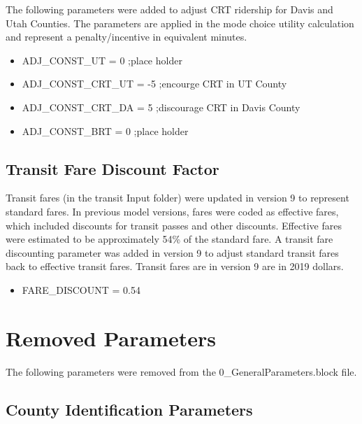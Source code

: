 \documentclass[
  letterpaper,
  DIV=11,
  numbers=noendperiod,
  titlepage=false]{scrreprt}
\providecommand{\tightlist}{%
  \setlength{\itemsep}{0pt}\setlength{\parskip}{0pt}}\usepackage{longtable,booktabs,array}
\begin{document}
The following parameters were added to adjust CRT ridership for Davis
and Utah Counties. The parameters are applied in the mode choice utility
calculation and represent a penalty/incentive in equivalent minutes.

\begin{itemize}
\tightlist
\item
  ADJ\_CONST\_UT = 0 ;place holder
\item
  ADJ\_CONST\_CRT\_UT = -5 ;encourge CRT in UT County
\item
  ADJ\_CONST\_CRT\_DA = 5 ;discourage CRT in Davis County
\item
  ADJ\_CONST\_BRT = 0 ;place holder
\end{itemize}

\hypertarget{transit-fare-discount-factor}{%
\subsection{Transit Fare Discount
Factor}\label{transit-fare-discount-factor}}

Transit fares (in the transit Input folder) were updated in version 9 to
represent standard fares. In previous model versions, fares were coded
as effective fares, which included discounts for transit passes and
other discounts. Effective fares were estimated to be approximately 54\%
of the standard fare. A transit fare discounting parameter was added in
version 9 to adjust standard transit fares back to effective transit
fares. Transit fares are in version 9 are in 2019 dollars.

\begin{itemize}
\tightlist
\item
  FARE\_DISCOUNT = 0.54
\end{itemize}

\hypertarget{removed-parameters}{%
\section{Removed Parameters}\label{removed-parameters}}

The following parameters were removed from the
0\_GeneralParameters.block file.

\hypertarget{county-identification-parameters}{%
\subsection{County Identification
Parameters}\label{county-identification-parameters}}
\end{document}
